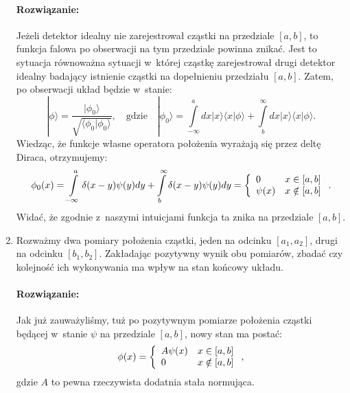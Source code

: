 \documentclass{article}
\begin{document}
\begin{enumerate}
\paragraph{Rozwiązanie:}
Jeżeli detektor idealny nie zarejestrował cząstki na przedziale $[a,b]$, to
funkcja falowa po obserwacji na tym przedziale powinna znikać. Jest to sytuacja 
równoważna sytuacji w~której cząstkę zarejestrował drugi detektor idealny 
badający istnienie cząstki na dopełnieniu przedziału $[a,b]$. Zatem, po 
obserwacji układ będzie w~stanie:
\[
|\phi\rangle = \frac{|\phi_0\rangle}{\sqrt{\langle\phi_0|\phi_0\rangle}} 
\mathrm{,} \quad \mathrm{gdzie} \quad
|\phi_0\rangle = \int\limits_{-\infty}^a dx|x\rangle\langle{}x|\phi\rangle + 
\int\limits_b^\infty dx|x\rangle\langle{}x|\phi\rangle \mathrm{.}
\]
Wiedząc, że funkcje własne operatora położenia wyrażają się przez deltę Diraca,
otrzymujemy:
\[
\phi_0(x) = \int\limits_{-\infty}^a\delta(x-y)\psi(y)dy + 
\int\limits_b^\infty\delta(x-y)\psi(y)dy = 
\left\{\begin{array}{l l}
	0 & x\in[a,b]\\
	\psi(x) & x\notin [a,b]
\end{array}\right.  \mathrm{.}
\]
Widać, że zgodnie z~naszymi intuicjami funkcja ta znika na przedziale $[a,b]$.

\item
Rozważmy dwa pomiary położenia cząstki, jeden na odcinku $[a_1,a_2]$, drugi na odcinku
$[b_1,b_2]$. Zakładając pozytywny wynik obu pomiarów, zbadać czy kolejność ich wykonywania
ma wpływ na stan końcowy układu. 

\paragraph{Rozwiązanie:}
Jak już zauważyliśmy, tuż po pozytywnym pomiarze położenia cząstki będącej w~stanie $\psi$
na przedziale $[a,b]$, nowy stan ma postać:
\[
\phi(x) = \left\{\begin{array}{l l}
	A\psi(x) & x \in [a,b] \\
	0 & x \notin [a,b]
\end{array}\right. \mathrm{,}
\]
gdzie $A$ to pewna rzeczywista dodatnia stała normująca.


\end{enumerate}
\end{document}
